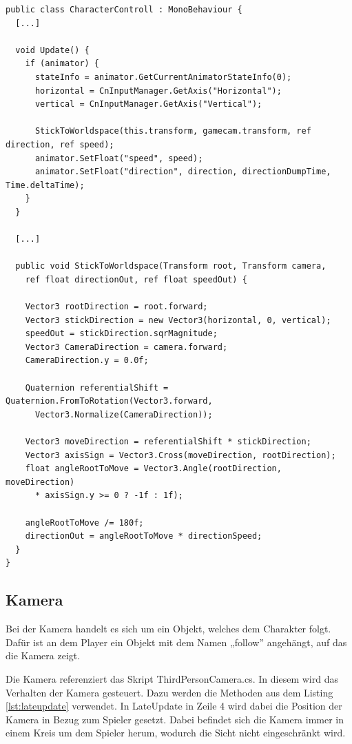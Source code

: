 \begin{scriptsize}
\lstset{
	float,
	caption=CharacterController.cs, 
	language=[Sharp]C, 
	frame=single,  
	showstringspaces=false, 
	showspaces=false, 
	numbers=left, 
	captionpos=b, 
	belowcaptionskip=4pt,
	basicstyle=\ttfamily
} 
\begin{lstlisting}[label=lst:charactercontroller]
public class CharacterControll : MonoBehaviour {
  [...]	
	
  void Update() {  
    if (animator) {
      stateInfo = animator.GetCurrentAnimatorStateInfo(0);
      horizontal = CnInputManager.GetAxis("Horizontal");
      vertical = CnInputManager.GetAxis("Vertical");
      
      StickToWorldspace(this.transform, gamecam.transform, ref direction, ref speed);
      animator.SetFloat("speed", speed);
      animator.SetFloat("direction", direction, directionDumpTime, Time.deltaTime);
    }
  }
    
  [...]

  public void StickToWorldspace(Transform root, Transform camera, 
    ref float directionOut, ref float speedOut) {
    
    Vector3 rootDirection = root.forward;
    Vector3 stickDirection = new Vector3(horizontal, 0, vertical);
    speedOut = stickDirection.sqrMagnitude;
    Vector3 CameraDirection = camera.forward;
    CameraDirection.y = 0.0f;
    
    Quaternion referentialShift = Quaternion.FromToRotation(Vector3.forward, 
      Vector3.Normalize(CameraDirection));
        	
    Vector3 moveDirection = referentialShift * stickDirection;
    Vector3 axisSign = Vector3.Cross(moveDirection, rootDirection);
    float angleRootToMove = Vector3.Angle(rootDirection, moveDirection) 
      * axisSign.y >= 0 ? -1f : 1f);      
        	
    angleRootToMove /= 180f;
    directionOut = angleRootToMove * directionSpeed;
  }
}
\end{lstlisting}
\end{scriptsize}

		\subsection{Kamera}
			Bei der Kamera handelt es sich um ein Objekt, welches dem Charakter folgt. Dafür ist an dem Player ein Objekt mit dem Namen „follow” angehängt, auf das die Kamera zeigt. 
	
			Die Kamera referenziert das Skript ThirdPersonCamera.cs. In diesem wird das Verhalten der Kamera gesteuert. Dazu werden die Methoden aus dem Listing \ref{lst:lateupdate} verwendet. In LateUpdate in Zeile 4 wird dabei die Position der Kamera in Bezug zum Spieler gesetzt. Dabei befindet sich die Kamera immer in einem Kreis um dem Spieler herum, wodurch die Sicht nicht eingeschränkt wird.

